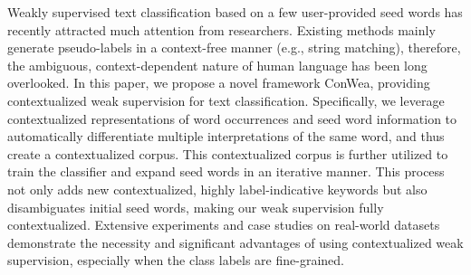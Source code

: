 Weakly supervised text classification based on a few user-provided seed words has recently attracted much attention from researchers. Existing methods mainly generate pseudo-labels in a context-free manner (e.g., string matching), therefore, the ambiguous, context-dependent nature of human language has been long overlooked. In this paper, we propose a novel framework ConWea, providing contextualized weak supervision for text classification. Specifically, we leverage contextualized representations of word occurrences and seed word information to automatically differentiate multiple interpretations of the same word, and thus create a contextualized corpus. This contextualized corpus is further utilized to train the classifier and expand seed words in an iterative manner. This process not only adds new contextualized, highly label-indicative keywords but also disambiguates initial seed words, making our weak supervision fully contextualized. Extensive experiments and case studies on real-world datasets demonstrate the necessity and significant advantages of using contextualized weak supervision, especially when the class labels are fine-grained.
